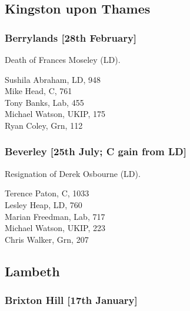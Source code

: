 \documentclass[a4paper,openany,10pt]{book}
\begin{document}
\subsection*{Kingston upon Thames}

\subsubsection*{Berrylands \hspace*{\fill}\nolinebreak[1]%
\enspace\hspace*{\fill}
[28th February]}


Death of Frances Moseley (LD).



Sushila Abraham, LD, 948\\
Mike Head, C, 761\\
Tony Banks, Lab, 455\\
Michael Watson, UKIP, 175\\
Ryan Coley, Grn, 112\\


\subsubsection*{Beverley \hspace*{\fill}\nolinebreak[1]%
\enspace\hspace*{\fill}
[25th July; C gain from LD]}


Resignation of Derek Osbourne (LD).



Terence Paton, C, 1033\\
Lesley Heap, LD, 760\\
Marian Freedman, Lab, 717\\
Michael Watson, UKIP, 223\\
Chris Walker, Grn, 207\\


\subsection*{Lambeth}

\subsubsection*{Brixton Hill \hspace*{\fill}\nolinebreak[1]%
\enspace\hspace*{\fill}
[17th January]}
\end{document}
